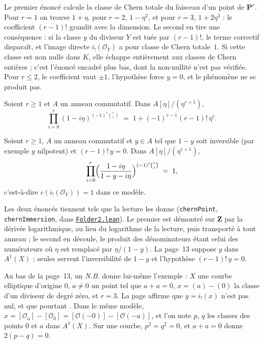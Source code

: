 Le premier énoncé calcule la classe de Chern totale du faisceau d'un point de $\mathbf P^r$. Pour $r = 1$ on trouve $1 + \eta$, pour $r = 2$, $1 - \eta^2$, et pour $r = 3$, $1 + 2\eta^3$ : le coefficient $(r-1)!$ grandit avec la dimension. Le second en tire une conséquence : si la classe $y$ du diviseur $Y$ est tuée par $(r-1)!$, le terme correctif disparaît, et l'image directe $i_!(\mathcal O_Y)$ a pour classe de Chern totale~$1$. Si cette classe est non nulle dans $K$, elle échappe entièrement aux classes de Chern entières ; c'est l'énoncé encadré plus bas, dont la non-nullité n'est pas vérifiée. Pour $r \leq 2$, le coefficient vaut $\pm 1$, l'hypothèse force $y = 0$, et le phénomène ne se produit pas.

\begin{encadre}
\begin{theoreme}\label{thm:2-point}
Soient $r \geq 1$ et $A$ un anneau commutatif. Dans $A[\eta]/(\eta^{r+1})$,
\[
  \prod_{i=0}^{r} (1 - i\eta)^{(-1)^i\binom ri} \;=\; 1 + (-1)^{r-1}(r-1)!\,\eta^r .
\]
\end{theoreme}
\end{encadre}

\begin{encadre}
\begin{theoreme}\label{thm:2-immersion}
Soient $r \geq 1$, $A$ un anneau commutatif et $y \in A$ tel que $1 - y$ soit inversible (par exemple $y$ nilpotent) et $(r-1)!\,y = 0$. Dans $A[\eta]/(\eta^{r+1})$,
\[
  \prod_{i=0}^{r} \Bigl(\frac{1 - i\eta}{1 - y - i\eta}\Bigr)^{(-1)^i\binom ri} \;=\; 1 ,
\]
c'est-à-dire $c(i_!(\mathcal O_Y)) = 1$ dans ce modèle.
\end{theoreme}
\end{encadre}

\noindent Les deux énoncés tiennent tels que la lecture les donne (\texttt{chernPoint}, \texttt{chernImmersion}, dans \href{\leanblob/AlgebraicGeometry/Folder2.lean}{\texttt{Folder2.\allowbreak{}lean}}). Le premier est démontré sur $\mathbf Z$ par la dérivée logarithmique, au lieu du logarithme de la lecture, puis transporté à tout anneau ; le second en découle, le produit des dénominateurs étant celui des numérateurs où $\eta$ est remplacé par $\eta/(1 - y)$. La page~13 suppose $y$ dans $A^1(X)$ ; seules servent l'inversibilité de $1 - y$ et l'hypothèse $(r-1)!\,y = 0$.

Au bas de la page~13, un \emph{N.B.} donne lui-même l'exemple : $X$ une courbe elliptique d'origine $0$, $a \neq 0$ un point tel que $a + a = 0$, $x = (a) - (0)$ la classe d'un diviseur de degré zéro, et $r = 3$. La page affirme que $y = i_!(x)$ n'est pas nul, et que pourtant . Dans le même modèle, $x = [\mathcal O_a] - [\mathcal O_0] = [\mathcal O(-0)] - [\mathcal O(-a)]$, et l'on note $p$, $q$ les classes des points $0$ et $a$ dans $A^1(X)$. Sur une courbe, $p^2 = q^2 = 0$, et $a + a = 0$ donne $2(p - q) = 0$.

